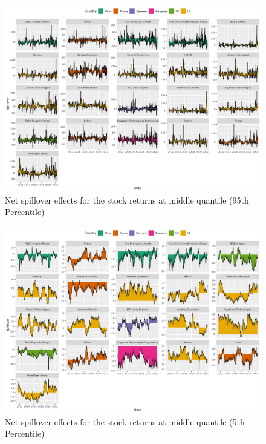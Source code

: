 \documentclass[
  letterpaper,
  DIV=11,
  numbers=noendperiod]{scrartcl}
\begin{document}
\begin{figure}
\centering
  \includegraphics{plots/fig-rtnnet95.png}
  \caption{Net spillover effects for the stock returns at middle quantile (95th Percentile)}
  \label{fig:netrtn95}
\end{figure}

\begin{figure}
\centering
  \includegraphics{plots/fig-rtnnet5.png}
  \caption{Net spillover effects for the stock returns at middle quantile (5th Percentile)}
  \label{fig:netrtnfive}
\end{figure}
\end{document}
